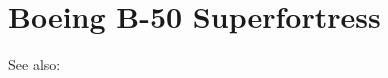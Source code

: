 \section{Boeing B-50 Superfortress}

\begin{adclist}
\end{adclist}

See also:
\begin{typelist}
\end{typelist}